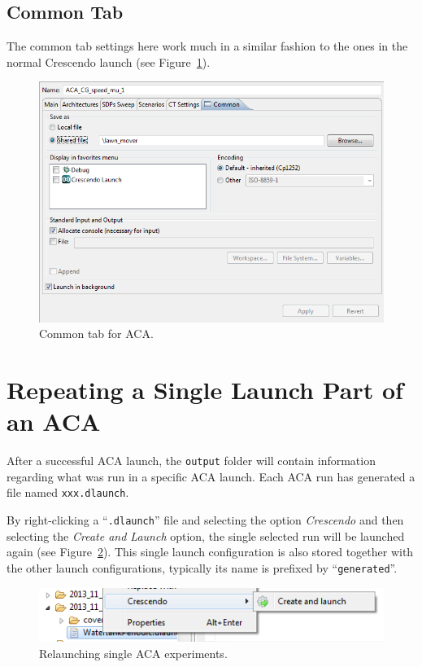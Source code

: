 \documentclass{crescendorepchap}
\begin{document}
\subsection{Common Tab}

The common tab settings here work much in a similar fashion to the ones in
the normal
Crescendo launch (see Figure~\ref{fig:CommontabACA}). 

\begin{figure}[htbp]
\centering
\includegraphics[width=.6\textwidth]{images/CommontabACA.png}
\caption{Common tab for ACA.\label{fig:CommontabACA}}
\end{figure}

\section{Repeating a Single Launch Part of an ACA}

After a successful ACA launch, the \texttt{output} folder will contain
information regarding what was run in a specific ACA launch. Each ACA run has generated a file named \texttt{xxx.dlaunch}.


By right-clicking a ``\texttt{.dlaunch}'' file and selecting the option
\emph{Crescendo} and then selecting the \emph{Create and Launch} option, 
the single selected run will
be launched again (see Figure~\ref{fig:CreateAndLaunchCommand}). 
This single launch configuration is also stored
together with the other launch configurations, typically its name is
prefixed by ``\texttt{generated}''.

\begin{figure}[htbp]
\centering
\includegraphics[width=.6\textwidth]{images/CreateAndLaunchCommand.png}
\caption{Relaunching single ACA experiments.\label{fig:CreateAndLaunchCommand}}
\end{figure}
\end{document}
